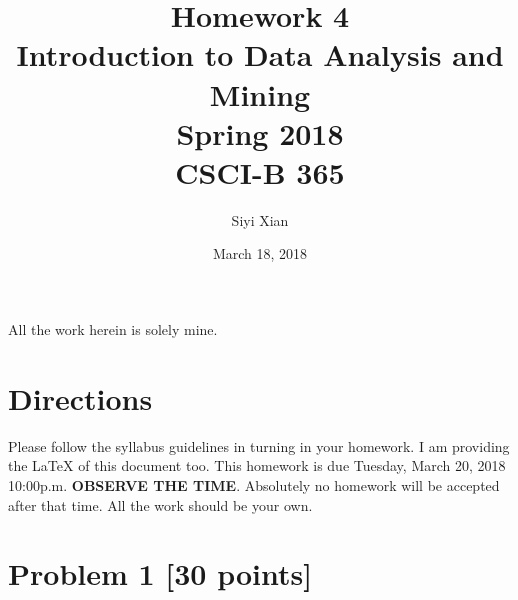 \documentclass{article}
\begin{document}
\title{Homework 4\\ Introduction to Data Analysis and Mining \\ Spring 2018\\ CSCI-B 365}         %
\author{Siyi Xian}        %
\date{March 18, 2018}          %
\maketitle
\makeatother     %
\pagestyle{plain}
All the work herein is solely mine.
\section*{Directions}
Please follow the syllabus guidelines in turning in your homework.  I am providing the \LaTeX{} of this document too. This homework is due Tuesday, March  20, 2018 10:00p.m. \textbf{OBSERVE THE  TIME}. Absolutely no homework will be accepted after that time. All the work should be your own.  
 


  \section*{Problem 1 [30 points]}  
  
\end{document}
